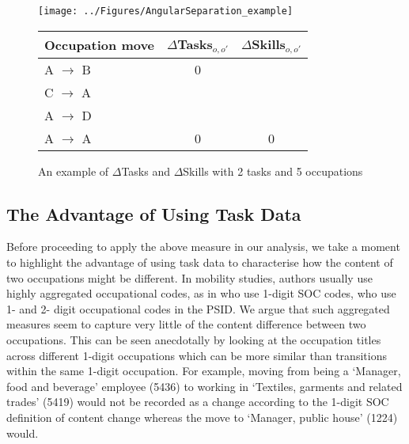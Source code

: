 \documentclass[11pt, oneside]{article}
\begin{document}
	\begin{figure}[h]
		\centering
		\texttt{[image: ../Figures/AngularSeparation\_example]}
		\qquad
		\begin{tabular}{lcc}
			Occupation move & $\Delta$Tasks$ _{o,o'}$& $\Delta$Skills$_{o,o'}$\\
			\hline
			\hline
			A $\rightarrow$ B & 0 &   \\
			C $\rightarrow$ A &   &   \\
			A $\rightarrow$ D &   &   \\
			A $\rightarrow$ A & 0 & 0 \\
		\end{tabular}
		\caption{An example of $\Delta$Tasks and $\Delta$Skills with 2 tasks and 5 occupations}
		\label{fig:AngSep}
	\end{figure}
	
	\subsection{The Advantage of Using Task Data}
	
	Before proceeding to apply the above measure in our analysis, we take a moment to highlight the advantage of using task data to characterise how the content of two occupations might be different. In mobility studies, authors usually use highly aggregated occupational codes, as in \cite{Carrillo-Tudela2016} who use 1-digit SOC codes, \cite{kambourov2009occupational} who use 1- and 2- digit occupational codes in the PSID. We argue that such aggregated measures seem to capture very little of the content difference between two occupations. This can be seen anecdotally by looking at the occupation titles across different 1-digit occupations which can be more similar than transitions within the same 1-digit occupation. For example, moving from being a `Manager, food and beverage' employee (5436) to working in `Textiles, garments and related trades' (5419) would not be recorded as a change according to the 1-digit SOC definition of content change whereas the move to `Manager, public house' (1224) would. 
	
	\vspace{2mm}
	
\end{document}
